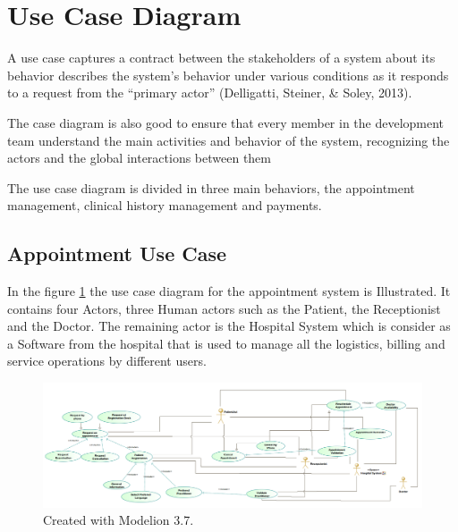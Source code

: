 \documentclass{article}
\begin{document}
            \newpage         
            \section{Use Case Diagram}

            A use case captures a contract between the stakeholders of a system about its behavior describes the
            system’s behavior under various conditions as it responds to a request from the “primary actor”
            (Delligatti, Steiner, & Soley, 2013). %

            The case diagram is also good to ensure that every member in the development team understand the main activities and behavior of the system,
            recognizing the actors and the global interactions between them

            The use case diagram is divided in three main behaviors, the appointment management, clinical history management and payments.

            \subsection{Appointment Use Case}

            In the figure \ref{fig:Appointmenr Use Case} the use case diagram for the appointment system is Illustrated. It contains four Actors, three Human actors such as the Patient, the Receptionist and the Doctor. 
            The remaining actor is the Hospital System which is consider as a Software from the hospital that is used to manage all the logistics, billing and service operations by different users.

            \begin{figure}[H]
                \centering 
                \includegraphics[width=1\linewidth]{./img/appointments.png}
                \caption{Created with Modelion 3.7.}
                \label{fig:Appointmenr Use Case}
            \end{figure}
\end{document}
